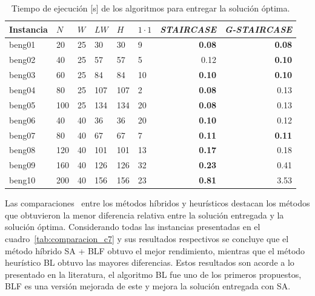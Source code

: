 \documentclass[letter, 10pt]{article}
\begin{document}
\renewcommand{\arraystretch}{1.1}
\begin{table}[H]
    \centering
    \begin{tabular}{|l|lllll|rr|}
    \hline
    Instancia & \multicolumn{1}{l}{$N$} & \multicolumn{1}{l}{$W$} & \multicolumn{1}{l}{$LW$} & \multicolumn{1}{l}{$H$} & \multicolumn{1}{l|}{$1 \cdot 1$} & \multicolumn{1}{l}{\emph{STAIRCASE}} & \multicolumn{1}{l|}{\emph{G-STAIRCASE}} \\ \hline
    beng01 & 20 & 25 & 30 & 30 & 9 & \textbf{0.08} & \textbf{0.08} \\ \hline
    beng02 & 40 & 25 & 57 & 57 & 5 & 0.12 & \textbf{0.10} \\ \hline
    beng03 & 60 & 25 & 84 & 84 & 10 & \textbf{0.10} & \textbf{0.10} \\ \hline
    beng04 & 80 & 25 & 107 & 107 & 2 & \textbf{0.08} & 0.13 \\ \hline
    beng05 & 100 & 25 & 134 & 134 & 20 & \textbf{0.08} & 0.13 \\ \hline
    beng06 & 40 & 40 & 36 & 36 & 20 & \textbf{0.10} & 0.12 \\ \hline
    beng07 & 80 & 40 & 67 & 67 & 7 & \textbf{0.11} & \textbf{0.11} \\ \hline
    beng08 & 120 & 40 & 101 & 101 & 13 & \textbf{0.17} & 0.18 \\ \hline
    beng09 & 160 & 40 & 126 & 126 & 32 & \textbf{0.23} & 0.41 \\ \hline
    beng10 & 200 & 40 & 156 & 156 & 23 & \textbf{0.81} & 3.53 \\ \hline
    \end{tabular}
    \caption{Tiempo de ejecuci\'on [s] de los algoritmos para entregar la soluci\'on \'optima.}
    \label{tab:comparacion_beng10}
\end{table}

Las comparaciones~\cite{hopper2001empirical} entre los m\'etodos h\'ibridos y heur\'isticos destacan los m\'etodos que obtuvieron la menor diferencia relativa entre la soluci\'on entregada y la soluci\'on \'optima. Considerando todas las instancias presentadas en el cuadro~\ref{tab:comparacion_c7} y sus resultados respectivos se concluye que el m\'etodo h\'ibrido SA + BLF obtuvo el mejor rendimiento, mientras que el m\'etodo heur\'istico BL obtuvo las mayores diferencias. Estos resultados son acorde a lo presentado en la literatura, el algoritmo BL fue uno de los primeros propuestos, BLF es una versi\'on mejorada de este y mejora la soluci\'on entregada con SA.
\end{document}
